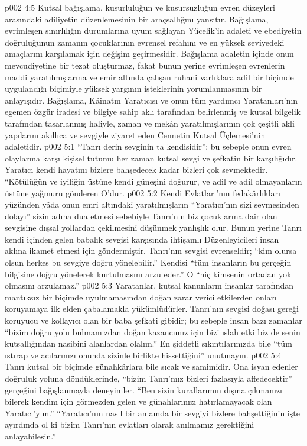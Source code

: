 \vs p002 4:5 Kutsal bağışlama, kusurluluğun ve kusursuzluğun evren düzeyleri arasındaki adiliyetin düzenlemesinin bir araçsallığını yansıtır. Bağışlama, evrimleşen sınırlılığın durumlarına uyum sağlayan Yücelik’in adaleti ve ebediyetin doğruluğunun zamanın çocuklarının evrensel refahını ve en yüksek seviyedeki amaçlarını karşılamak için değişim geçirmesidir. Bağışlama adaletin içinde onun mevcudiyetine bir tezat oluşturmaz, fakat bunun yerine evrimleşen evrenlerin maddi yaratılmışlarına ve emir altında çalışan ruhani varlıklara adil bir biçimde uygulandığı biçimiyle yüksek yargının isteklerinin yorumlanmasının bir anlayışıdır. Bağışlama, Kâinatın Yaratıcısı ve onun tüm yardımcı Yaratanları’nın egemen özgür iradesi ve bilgiye sahip aklı tarafından belirlenmiş ve kutsal bilgelik tarafından tasarlanmış haliyle, zaman ve mekân yaratılmışlarının çok çeşitli akli yapılarını akıllıca ve sevgiyle ziyaret eden Cennetin Kutsal Üçlemesi’nin adaletidir.
\vs p002 5:1 “Tanrı derin sevginin ta kendisidir”; bu sebeple onun evren olaylarına karşı kişisel tutumu her zaman kutsal sevgi ve şefkatin bir karşılığıdır. Yaratıcı kendi hayatını bizlere bahşedecek kadar bizleri çok sevmektedir. “Kötülüğün ve iyiliğin üstüne kendi güneşini doğurur, ve adil ve adil olmayanların üstüne yağmuru gönderen O’dur.
\vs p002 5:2 Kendi Evlatları’nın fedakârlıkları yüzünden yâda onun emri altındaki yaratılmışların “Yaratıcı’nın sizi sevmesinden dolayı” sizin adına dua etmesi sebebiyle Tanrı’nın biz çocuklarına dair olan sevgisine dışsal yollardan çekilmesini düşünmek yanlışlık olur. Bunun yerine Tanrı kendi içinden gelen babalık sevgisi karşısında ihtişamlı Düzenleyicileri insan aklına ikamet etmesi için göndermiştir. Tanrı’nın sevgisi evrenseldir; “kim olursa olsun herkes bu sevgiye doğru yönelebilir.” Kendisi “tüm insanların bu gerçeğin bilgisine doğru yönelerek kurtulmasını arzu eder.” O “hiç kimsenin ortadan yok olmasını arzulamaz.”
\vs p002 5:3 Yaratanlar, kutsal kanunların insanlar tarafından mantıksız bir biçimde uyulmamasından doğan zarar verici etkilerden onları koruyamaya ilk elden çabalamakla yükümlüdürler. Tanrı’nın sevgisi doğası gereği koruyucu ve kollayıcı olan bir baba şefkati gibidir; bu sebeple insan bazı zamanlar “bizim doğru yolu bulmamızdan doğan kazancımız için bizi ıslah etki biz de senin kutsallığından nasibini alanlardan olalım.” En şiddetli sıkıntılarınızda bile “tüm ıstırap ve acılarınızı onunda sizinle birlikte hissettiğini” unutmayın.
\vs p002 5:4 Tanrı kutsal bir biçimde günahkârlara bile sıcak ve samimidir. Ona isyan edenler doğruluk yoluna döndüklerinde, “bizim Tanrı’mız bizleri fazlasıyla affedecektir” gerçeğini bağışlanmayla deneyimler. “Ben sizin kurallarımın dışına çıkmanızı bilerek kendim için görmezden gelen ve günahlarınızı hatırlamayacak olan Yaratıcı'yım.” “Yaratıcı’nın nasıl bir anlamda bir sevgiyi bizlere bahşettiğinin işte ayırdında ol ki bizim Tanrı’nın evlatları olarak anılmamız gerektiğini anlayabilesin.”

